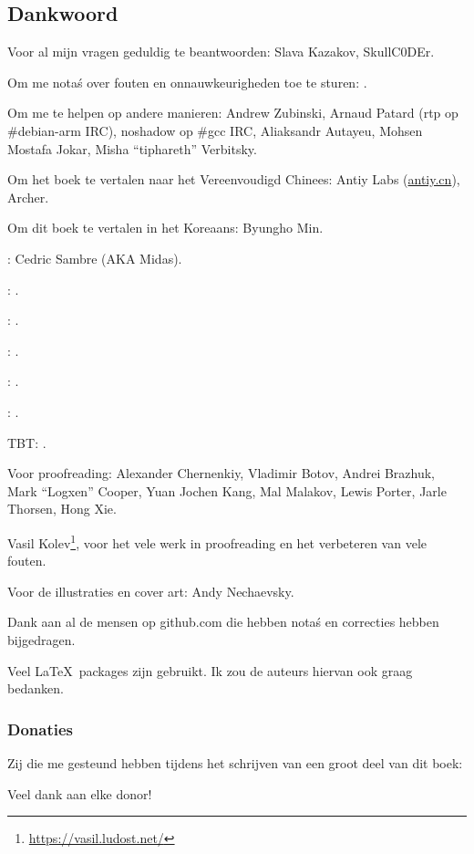 \subsection*{Dankwoord}

Voor al mijn vragen geduldig te beantwoorden: Slava  Kazakov, SkullC0DEr.

Om me nota\'s over fouten en onnauwkeurigheden toe te sturen: \PeopleMistakesInaccuracies{}.

Om me te helpen op andere manieren:
Andrew Zubinski,
Arnaud Patard (rtp op \#debian-arm IRC),
noshadow op \#gcc IRC,
Aliaksandr Autayeu, Mohsen Mostafa Jokar,
Misha ``tiphareth'' Verbitsky.

Om het boek te vertalen naar het Vereenvoudigd Chinees:
Antiy Labs (\href{http://antiy.cn}{antiy.cn}), Archer.

Om dit boek te vertalen in het Koreaans: Byungho Min.

\NLph{}: Cedric Sambre (AKA Midas).

\NLph{}: \PeopleSpanishTranslators{}.

\NLph{}: \PeoplePTBRTranslators{}.

\NLph{}: \PeopleItalianTranslators{}.

\NLph{}: \PeopleFrenchTranslators{}.

\NLph{}: \PeopleGermanTranslators{}.

\ac{TBT}: \PeoplePolishTranslators{}.


Voor proofreading:
Alexander  Chernenkiy,
Vladimir Botov,
Andrei Brazhuk,
Mark ``Logxen'' Cooper, Yuan Jochen Kang, Mal Malakov, Lewis Porter, Jarle Thorsen, Hong Xie.

Vasil Kolev\footnote{\url{https://vasil.ludost.net/}}, voor het vele werk in proofreading en het verbeteren van vele fouten.

Voor de illustraties en cover art: Andy Nechaevsky.

Dank aan al de mensen op github.com die hebben nota\'s en correcties hebben bijgedragen\FNGithubContributors{}.

Veel \LaTeX\ packages zijn gebruikt. Ik zou de auteurs hiervan ook graag bedanken.

\subsubsection*{Donaties}

Zij die me gesteund hebben tijdens het schrijven van een groot deel van dit boek:



Veel dank aan elke donor!
